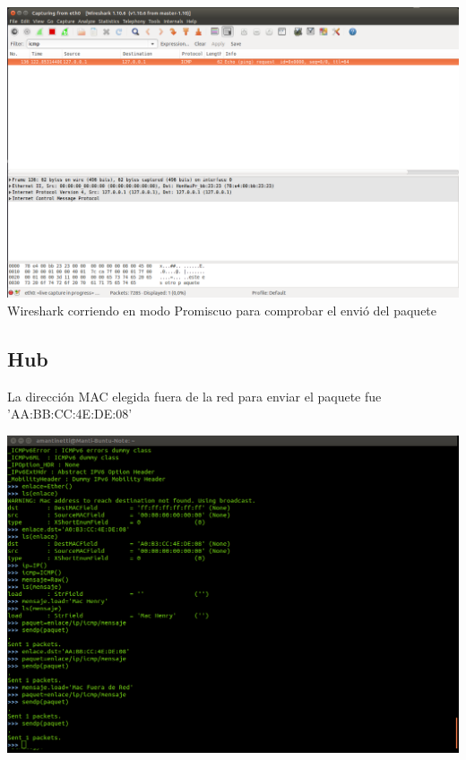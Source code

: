\documentclass[spanish]{udpreport}
\begin{document}
\begin{center}
	\includegraphics[scale=.27]{imagenes/Switch/Test_3_Wireshark.png}
	\\ Wireshark corriendo en modo Promiscuo para comprobar el envió del paquete
\end{center}

\newpage


\subsection{Hub}

La dirección MAC elegida fuera de la red para enviar el paquete fue 'AA:BB:CC:4E:DE:08'

\begin{center}
	\includegraphics[scale=.27]{imagenes/Hub/consoleout.png}
\end{center}
\end{document}
